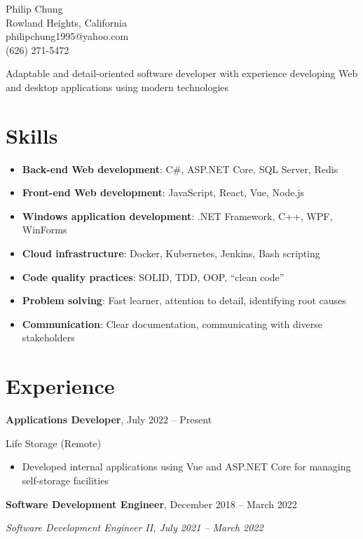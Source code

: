\documentclass[10pt]{article}
\newcommand{\titleheader}[2]{\textbf{#1}, #2}
\newcommand{\secondaryheader}[1]{\hspace{2.25em} \textit{#1}}
\newcommand{\locheader}[2]{#1 (#2)}
\begin{document}
	\begin{center}
		{\LARGE Philip Chung} \\
		Rowland Heights, California \\
		philipchung1995@yahoo.com \\
		(626) 271-5472 \\
	\end{center}

	Adaptable and detail-oriented software developer with experience developing Web and desktop applications using modern technologies

	\section*{Skills}

	\newcommand{\skillitem}[2]{\item \textbf{#1}: #2}

	\begin{itemize}
		\skillitem{Back-end Web development}{C\#, ASP.NET Core, SQL Server, Redis}
		\skillitem{Front-end Web development}{JavaScript, React, Vue, Node.js}
		\skillitem{Windows application development}{.NET Framework, C++, WPF, WinForms}
		\skillitem{Cloud infrastructure}{Docker, Kubernetes, Jenkins, Bash scripting}
		\skillitem{Code quality practices}{SOLID, TDD, OOP, ``clean code''}
		\skillitem{Problem solving}{Fast learner, attention to detail, identifying root causes}
		\skillitem{Communication}{Clear documentation, communicating with diverse stakeholders}
	\end{itemize}

	\section*{Experience}

	\titleheader{Applications Developer}{July 2022 -- Present}

	\locheader{Life Storage}{Remote}

	\begin{itemize}
		\item Developed internal applications using Vue and ASP.NET Core for managing self-storage facilities
	\end{itemize}

	\titleheader{Software Development Engineer}{December 2018 -- March 2022}

	\secondaryheader{Software Development Engineer II, July 2021 -- March 2022}
\end{document}
